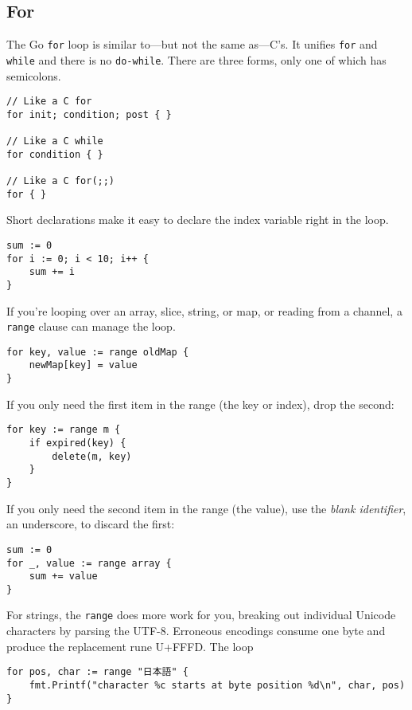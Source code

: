\subsection*{For}

The Go \texttt{for} loop is similar to---but not the same as---C's. It
unifies \texttt{for} and \texttt{while} and there is no
\texttt{do-while}. There are three forms, only one of which has
semicolons.

\begin{Verbatim}[frame=single]
// Like a C for
for init; condition; post { }

// Like a C while
for condition { }

// Like a C for(;;)
for { }
\end{Verbatim}

Short declarations make it easy to declare the index variable right in
the loop.

\begin{Verbatim}[frame=single]
sum := 0
for i := 0; i < 10; i++ {
    sum += i
}
\end{Verbatim}

If you're looping over an array, slice, string, or map, or reading from
a channel, a \texttt{range} clause can manage the loop.

\begin{Verbatim}[frame=single]
for key, value := range oldMap {
    newMap[key] = value
}
\end{Verbatim}

If you only need the first item in the range (the key or index), drop
the second:

\begin{Verbatim}[frame=single]
for key := range m {
    if expired(key) {
        delete(m, key)
    }
}
\end{Verbatim}

If you only need the second item in the range (the value), use the
\emph{blank identifier}, an underscore, to discard the first:

\begin{Verbatim}[frame=single]
sum := 0
for _, value := range array {
    sum += value
}
\end{Verbatim}

For strings, the \texttt{range} does more work for you, breaking out
individual Unicode characters by parsing the UTF-8. Erroneous encodings
consume one byte and produce the replacement rune U+FFFD. The loop

\begin{Verbatim}[frame=single]
for pos, char := range "日本語" {
    fmt.Printf("character %c starts at byte position %d\n", char, pos)
}
\end{Verbatim}

